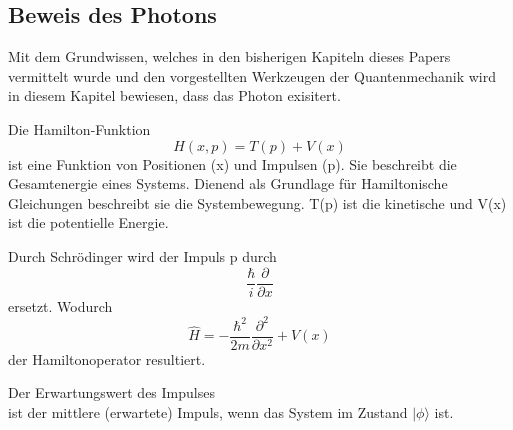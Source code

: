 \subsection{Beweis des Photons\label{fourier:subsection:BeweisPhoton}}
Mit dem Grundwissen, welches in den bisherigen Kapiteln dieses Papers vermittelt wurde und den vorgestellten Werkzeugen der Quantenmechanik wird in diesem Kapitel bewiesen, dass das Photon exisitert.

Die Hamilton-Funktion
\begin{equation}
	H(x,p) = T(p) + V(x)
\end{equation}
ist eine Funktion von Positionen (x) und Impulsen (p).
Sie beschreibt die Gesamtenergie eines Systems.
Dienend als Grundlage für Hamiltonische Gleichungen beschreibt sie die Systembewegung.
T(p) ist die kinetische und V(x) ist die potentielle Energie.

Durch Schrödinger wird der Impuls p durch
\begin{equation}
	\frac{\hbar}{i} \frac{\partial}{\partial x}
\end{equation}
ersetzt.
Wodurch
\begin{equation}
	\hat{H} = -\frac{\hbar^2}{2m}\frac{\partial^2}{\partial x^2} + V(x)
\end{equation}	
der Hamiltonoperator resultiert.

Der Erwartungswert des Impulses
\begin{equation}

\end{equation}
ist der mittlere (erwartete) Impuls, wenn das System im Zustand $| \phi \rangle$ ist.
